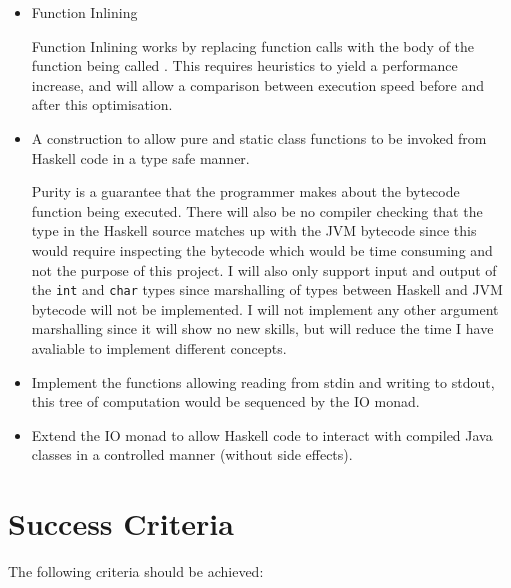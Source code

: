 \documentclass[12pt,a4paper,twoside]{article}
\begin{document}
  \begin{itemize}
    \item Function Inlining

      Function Inlining works by replacing function calls with the body of the function being called \cite{ghc-inliner}.
      This requires heuristics to yield a performance increase, and will allow a comparison between execution speed before and after this optimisation.

    \item A construction to allow pure and static class functions to be invoked from Haskell code in a type safe manner.

      Purity is a guarantee that the programmer makes about the bytecode function being executed.
      There will also be no compiler checking that the type in the Haskell source matches up with the JVM bytecode since this would require inspecting the bytecode which
      would be time consuming and not the purpose of this project. I will also only support input and output of the \texttt{int} and \texttt{char} types since
      marshalling of types between Haskell and JVM bytecode will not be implemented. I will not implement any other argument marshalling since it will show no new
      skills, but will reduce the time I have avaliable to implement different concepts.

    \item Implement the functions allowing reading from stdin and writing to stdout, this tree of computation would be sequenced by the IO monad.

    \item Extend the IO monad to allow Haskell code to interact with compiled Java classes in a controlled manner (without side effects).

  \end{itemize}

  \section*{Success Criteria}

  The following criteria should be achieved:
\end{document}
